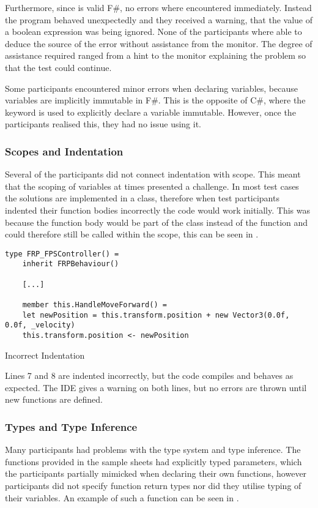 Furthermore, since  is valid F\#, no errors where encountered immediately. Instead the program behaved unexpectedly and they received a warning, that the value of a boolean expression was being ignored. None of the participants where able to deduce the source of the error without assistance from the monitor. The degree of assistance required ranged from a hint to the monitor explaining the problem so that the test could continue.

Some participants encountered minor errors when declaring variables, because variables are implicitly immutable in F\#. This is the opposite of C\#, where the  keyword is used to explicitly declare a variable immutable. However, once the participants realised this, they had no issue using it.

\subsubsection{Scopes and Indentation}
Several of the participants did not connect indentation with scope. This meant that the scoping of variables at times presented a challenge. In most test cases the solutions are implemented in a class, therefore when test participants indented their function bodies incorrectly the code would work initially. This was because the function body would be part of the class instead of the function and could therefore still be called within the scope, this can be seen in .

\begin{listing}[H]
\begin{verbatim}
type FRP_FPSController() =
    inherit FRPBehaviour()

    [...]

    member this.HandleMoveForward() =
    let newPosition = this.transform.position + new Vector3(0.0f, 0.0f, _velocity)
    this.transform.position <- newPosition
\end{verbatim}
\caption{Incorrect Indentation}
\label{lst:scope-prob}
\end{listing}

Lines 7 and 8 are indented incorrectly, but the code compiles and behaves as expected. The \gls{IDE} gives a warning on both lines, but no errors are thrown until new  functions are defined.

\subsubsection{Types and Type Inference}
Many participants had problems with the type system and type inference. The functions provided in the sample sheets had explicitly typed parameters, which the participants partially mimicked when declaring their own functions, however participants did not specify function return types nor did they utilise typing of their variables. An example of such a function can be seen in .

